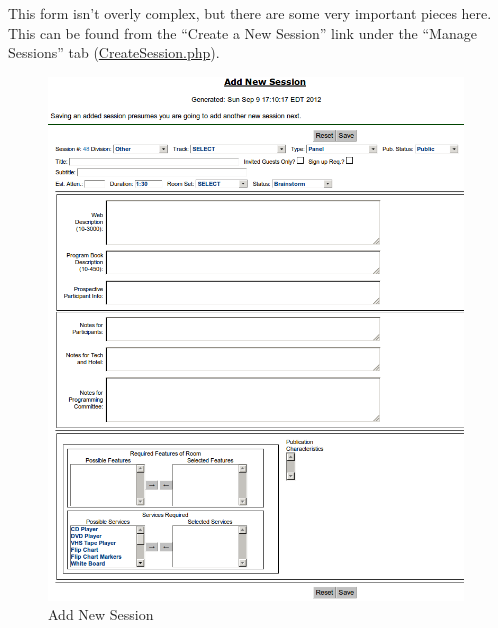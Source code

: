 \documentclass[tablesignature]{scrartcl}
\begin{document}
   This form isn't overly complex, but there are some very important
   pieces here.  This can be found from the ``Create a New Session''
   link under the ``Manage Sessions'' tab (\hyperref[CreateSession.php]{CreateSession.php}).

\begin{figure}[H]
\centering
\includegraphics[width=0.98\textwidth]{./Images/Add_New_Session.png}
\caption{\label{fig:Zambia_Presenter_Flow_Add_New_Session}Add New Session}
\end{figure}
\end{document}
